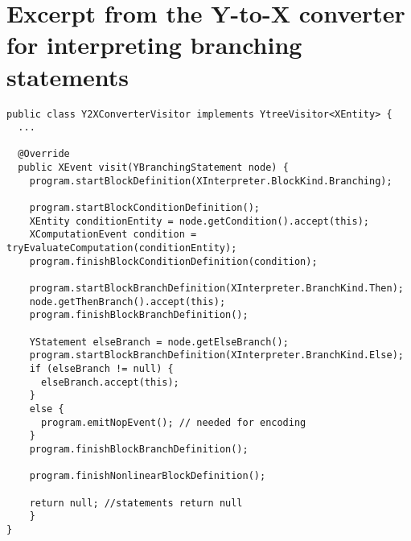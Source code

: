 \section{Excerpt from the Y-to-X converter for interpreting branching statements}
\label{apx:y2x}

\begin{lstlisting}
public class Y2XConverterVisitor implements YtreeVisitor<XEntity> {
  ...

  @Override
  public XEvent visit(YBranchingStatement node) {
    program.startBlockDefinition(XInterpreter.BlockKind.Branching);

    program.startBlockConditionDefinition();
    XEntity conditionEntity = node.getCondition().accept(this);
    XComputationEvent condition = tryEvaluateComputation(conditionEntity);
    program.finishBlockConditionDefinition(condition);

    program.startBlockBranchDefinition(XInterpreter.BranchKind.Then);
    node.getThenBranch().accept(this);
    program.finishBlockBranchDefinition();

    YStatement elseBranch = node.getElseBranch();
    program.startBlockBranchDefinition(XInterpreter.BranchKind.Else);
    if (elseBranch != null) {
      elseBranch.accept(this);
    }
    else {
      program.emitNopEvent(); // needed for encoding
    }
    program.finishBlockBranchDefinition();

    program.finishNonlinearBlockDefinition();

    return null; //statements return null
    }
}
\end{lstlisting}
